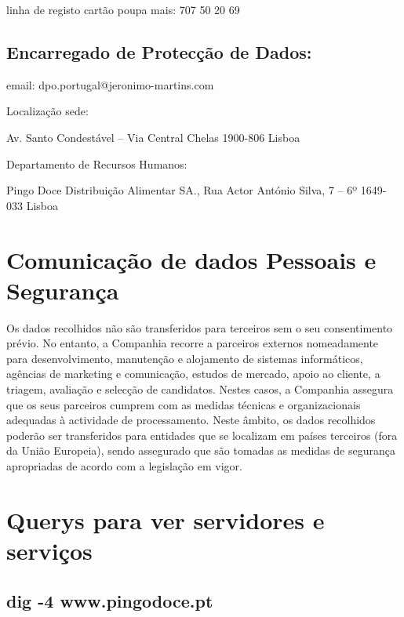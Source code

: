 linha de registo cartão poupa mais: 707 50 20 69\newline


\subsection{Encarregado de Protecção de Dados:}

email: dpo.portugal@jeronimo-martins.com\newline


Localização sede:\newline 


Av. Santo Condestável – Via Central Chelas 1900-806 Lisboa\newline

Departamento de Recursos Humanos: \newline


Pingo Doce Distribuição Alimentar SA., Rua Actor António Silva, 7 – 6º 1649-033 Lisboa



\section{Comunicação de dados Pessoais e Segurança}

Os dados recolhidos não são transferidos para terceiros sem o seu consentimento prévio. No entanto, a Companhia recorre a parceiros externos nomeadamente para desenvolvimento, manutenção e alojamento de sistemas informáticos, agências de marketing e comunicação, estudos de mercado, apoio ao cliente, a triagem, avaliação e selecção de candidatos. Nestes casos, a Companhia assegura que os seus parceiros cumprem com as medidas técnicas e organizacionais adequadas à actividade de processamento. Neste âmbito, os dados recolhidos poderão ser transferidos para entidades que se localizam em países terceiros (fora da União Europeia), sendo assegurado que são tomadas as medidas de segurança apropriadas de acordo com a legislação em vigor.



\section{Querys para ver servidores e serviços}

\subsection{dig -4 www.pingodoce.pt}

